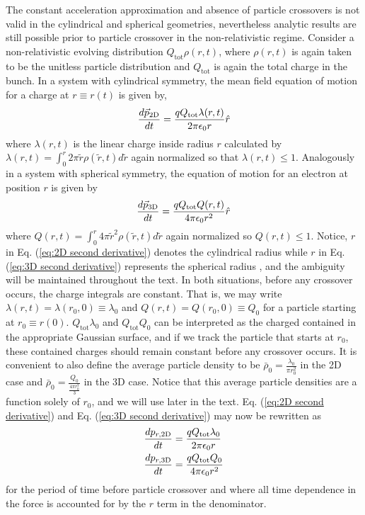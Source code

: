 \documentclass[aps,prl,twocolumn,showpacs,superscriptaddress,groupedaddress]{revtex4-1}  %
\begin{document}
{The constant acceleration approximation and absence 
of particle crossovers is not valid in the cylindrical and 
spherical geometries, nevertheless analytic results are still possible prior to 
particle crossover in the non-relativistic regime.   Consider a non-relativistic evolving distribution 
$Q_\text{tot} \rho(r,t)$, where $\rho(r,t)$ is again taken to be the unitless
particle distribution and $Q_\text{tot}$ is again the total charge in the bunch.    In a system with cylindrical symmetry,
the mean field equation of motion for a charge at $r \equiv r(t)$ is given by,
\begin{equation}\label{eq:2D second derivative}
  \frac{d \vec{p}_\text{2D}}{dt} = { q Q_\text{tot} \lambda (r,t)\over 2 \pi \epsilon_0 r}\hat{r} 
\end{equation}
where $\lambda(r,t)$ is the linear charge inside radius $r$ calculated by
$\lambda(r,t) = \int_0^{r} 2\pi \tilde{r} \rho(\tilde{r},t) d\tilde{r}$ again
normalized so that $\lambda(r,t) \le 1$.
Analogously in a system with spherical symmetry,
the equation of motion for an electron at position $r$ is given by
\begin{equation}\label{eq:3D second derivative}
  \frac{d \vec{p}_\text{3D}}{dt} = { q Q_\text{tot} Q(r,t)\over4\pi \epsilon_0 r^2}\hat{r} 
\end{equation}
where $Q(r,t) = \int_0^{r} 4\pi \tilde{r}^2 \rho(\tilde{r},t) d\tilde{r}$ again normalized so
$Q(r,t) \le 1$.  Notice, $r$ in Eq. (\ref{eq:2D second derivative}) denotes the cylindrical radius while
$r$ in Eq.  (\ref{eq:3D second derivative}) represents the spherical radius
, and the ambiguity will be maintained
throughout the text.  In both situations, before
any crossover occurs, the charge integrals 
are constant.  That is, we may write
$\lambda(r,t) = \lambda(r_0,0) \equiv \lambda_0$
and $Q(r,t) = Q(r_0,0) \equiv Q_0$ for a particle starting at $r_0 \equiv r(0)$.
$Q_\text{tot} \lambda_0$ and $Q_\text{tot} Q_0$ can be 
interpreted as the charged contained in the appropriate Gaussian surface,
and if we track the particle that starts at $r_0$, these contained charges should remain constant
before any crossover occurs.
It is convenient to also define the average particle density to be
$\bar{\rho}_0 = \frac{\lambda_0}{\pi r_0^2 }$ in the 2D case and 
 $\bar{\rho}_0 = \frac{Q_0}{\frac{4\pi r_0^3}{3} }$ in the 3D case.  Notice that
 this average particle densities are a function solely of $r_0$, and
 we will use later in the text.
Eq. (\ref{eq:2D second derivative}) and 
Eq. (\ref{eq:3D second derivative}) may now be rewritten as 
\begin{align}
  \frac{d p_{r,\text{2D}}}{dt} &= { q Q_\text{tot} \lambda_0\over 2 \pi \epsilon_0 r}\label{eq:2D equation of motion}\\ 
  \frac{d p_{r,\text{3D}}}{dt} &= { q Q_\text{tot} Q_0\over 4 \pi \epsilon_0 r^2}\label{eq:3D equation of motion}
\end{align}
for the period of time before particle crossover and where all time dependence in the force is accounted for by the
$r$ term in the denominator.

}
\end{document}
